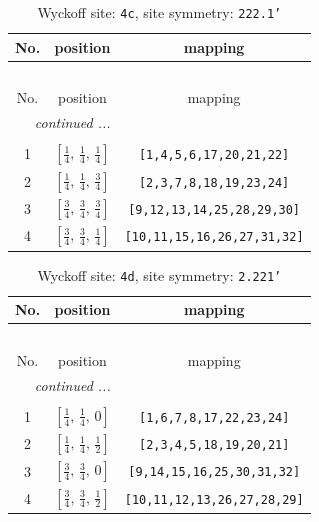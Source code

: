 \documentclass[fleqn,8pt]{jsarticle}
\begin{document}
\renewcommand{\arraystretch}{1.2}
\begin{longtable}{ccc}
\caption{Wyckoff site: {\tt 4c}, site symmetry: {\tt 222.1'}}
 \\
 \hline \hline
No. & position & mapping \\ \hline \endfirsthead

\multicolumn{2}{l}{\tablename\ \thetable{}} \\
 \hline \hline
No. & position & mapping \\ \hline \endhead

 \hline \hline
\multicolumn{2}{r}{\footnotesize\it continued ...} \\ \endfoot

 \hline \hline
\multicolumn{2}{r}{} \\ \endlastfoot

1 & $\left[ \frac{1}{4},\, \frac{1}{4},\, \frac{1}{4} \right]$ & {\tt [1,4,5,6,17,20,21,22]} \\ \hline
2 & $\left[ \frac{1}{4},\, \frac{1}{4},\, \frac{3}{4} \right]$ & {\tt [2,3,7,8,18,19,23,24]} \\ \hline
3 & $\left[ \frac{3}{4},\, \frac{3}{4},\, \frac{3}{4} \right]$ & {\tt [9,12,13,14,25,28,29,30]} \\ \hline
4 & $\left[ \frac{3}{4},\, \frac{3}{4},\, \frac{1}{4} \right]$ & {\tt [10,11,15,16,26,27,31,32]} \\
\end{longtable}
\renewcommand{\arraystretch}{1.2}
\begin{longtable}{ccc}
\caption{Wyckoff site: {\tt 4d}, site symmetry: {\tt 2.221'}}
 \\
 \hline \hline
No. & position & mapping \\ \hline \endfirsthead

\multicolumn{2}{l}{\tablename\ \thetable{}} \\
 \hline \hline
No. & position & mapping \\ \hline \endhead

 \hline \hline
\multicolumn{2}{r}{\footnotesize\it continued ...} \\ \endfoot

 \hline \hline
\multicolumn{2}{r}{} \\ \endlastfoot

1 & $\left[ \frac{1}{4},\, \frac{1}{4},\, 0 \right]$ & {\tt [1,6,7,8,17,22,23,24]} \\ \hline
2 & $\left[ \frac{1}{4},\, \frac{1}{4},\, \frac{1}{2} \right]$ & {\tt [2,3,4,5,18,19,20,21]} \\ \hline
3 & $\left[ \frac{3}{4},\, \frac{3}{4},\, 0 \right]$ & {\tt [9,14,15,16,25,30,31,32]} \\ \hline
4 & $\left[ \frac{3}{4},\, \frac{3}{4},\, \frac{1}{2} \right]$ & {\tt [10,11,12,13,26,27,28,29]} \\
\end{longtable}
\end{document}
